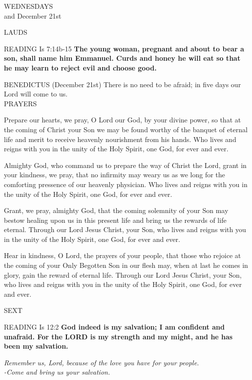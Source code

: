 \begin{center}\normalsize{\uppercase{Wednesdays}\\}
\footnotesize{and December 21st}\end{center}
\begin{flushleft}\normalsize{\uppercase{Lauds\\}}\end{flushleft}
\noindent\small{\uppercase{Reading}} Is 7:14b-15 \textbf{ The young woman, pregnant and about to bear a son, shall name him Emmanuel. Curds and honey he will eat so that he may learn to reject evil and choose good.\\}

\noindent\small{\uppercase{Benedictus}} (December 21st)
There is no need to be afraid; in five days our Lord will come to us.\\

\noindent\small{\uppercase{Prayers}}\begin{description}[labelindent=\parindent, leftmargin=*]
\item [Week 1] Prepare our hearts, we pray, O Lord our God, by your divine power, so that at the coming of Christ your Son we may be found worthy of the banquet of eternal life and merit to receive heavenly nourishment from his hands. Who lives and reigns with you in the unity of the Holy Spirit, one God, for ever and ever.
\item [Week 2] Almighty God, who command us to prepare the way of Christ the Lord, grant in your kindness, we pray, that no infirmity may weary us as we long for the comforting pressence of our heavenly physician. Who lives and reigns with you in the unity of the Holy Spirit, one God, for ever and ever.
\item [Week 3] Grant, we pray, almighty God, that the coming solemnity of your Son may bestow healing upon us in this present life and bring us the rewards of life eternal. Through our Lord Jesus Christ, your Son, who lives and reigns with you in the unity of the Holy Spirit, one God, for ever and ever.
\item [December 21st] Hear in kindness, O Lord, the prayers of your people, that those who rejoice at the coming of your Only Begotten Son in our flesh may, when at last he comes in glory, gain the reward of eternal life. Through our Lord Jesus Christ, your Son, who lives and reigns with you in the unity of the Holy Spirit, one God, for ever and ever.
\end{description}


\begin{flushleft}\normalsize{\uppercase{Sext\\}}\end{flushleft}
\noindent\small{\uppercase{Reading}} Is 12:2 \textbf{ God indeed is my salvation; I am confident and unafraid. For the LORD is my strength and my might, and he has been my salvation.\\}
\begin{center}\textit{Remember us, Lord, because of the love you have for your people.\\
-Come and bring us your salvation.}\end{center}
                                   

